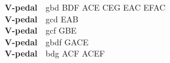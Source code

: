 \documentclass[letterpaper,12pt]{article}
\begin{document}
\begin{multicols}{4}
\noindent\hangindent=0.25in {\color{lhcol}\bfseries V-pedal}~~gbd {\ttfamily BDF  ACE  CEG  EAC  EFAC}\\[0.1mm]
\noindent\hangindent=0.25in {\color{lhcol}\bfseries V-pedal}~~gcd {\ttfamily EAB}\\[0.1mm]
\noindent\hangindent=0.25in {\color{lhcol}\bfseries V-pedal}~~gcf {\ttfamily GBE}\\[0.1mm]
\noindent\hangindent=0.25in {\color{lhcol}\bfseries V-pedal}~~gbdf {\ttfamily GACE}\\[0.1mm]
\noindent\hangindent=0.25in {\color{lhcol}\bfseries V-pedal}~~bdg {\ttfamily ACF  ACEF}\\[0.1mm]
\vspace{1.5mm}


\end{multicols}
\end{document}

